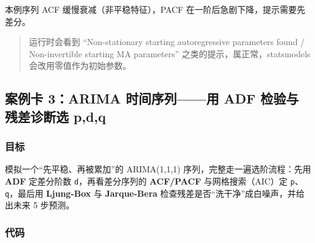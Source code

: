 本例序列 ACF 缓慢衰减（非平稳特征），PACF
在一阶后急剧下降，提示需要先差分。

\begin{quote}
运行时会看到 ``Non-stationary starting autoregressive parameters found /
Non-invertible starting MA parameters'' 之类的提示，属正常，statsmodels
会改用零值作为初始参数。
\end{quote}

\subsection{案例卡 3：ARIMA 时间序列------用 ADF 检验与残差诊断选
p,d,q}\label{ux6848ux4f8bux5361-3arima-ux65f6ux95f4ux5e8fux5217ux7528-adf-ux68c0ux9a8cux4e0eux6b8bux5deeux8bcaux65adux9009-pdq}

\subsubsection{目标}\label{ux76eeux6807-29}

模拟一个``先平稳、再被累加''的 ARIMA(1,1,1)
序列，完整走一遍选阶流程：先用 \textbf{ADF} 定差分阶数
\texttt{d}，再看差分序列的 \textbf{ACF/PACF} 与网格搜索（AIC）定
\texttt{p}、\texttt{q}，最后用 \textbf{Ljung-Box} 与
\textbf{Jarque-Bera} 检查残差是否``洗干净''成白噪声，并给出未来 5
步预测。

\subsubsection{代码}\label{ux4ee3ux7801-30}

